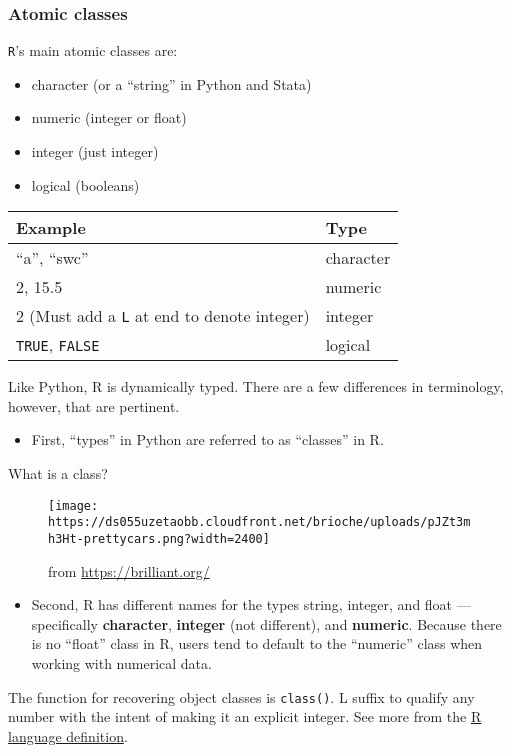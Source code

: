 \documentclass[
]{book}
\providecommand{\tightlist}{%
  \setlength{\itemsep}{0pt}\setlength{\parskip}{0pt}}
\begin{document}
\hypertarget{atomic-classes}{%
\subsubsection{Atomic classes}\label{atomic-classes}}

\texttt{R}'s main atomic classes are:

\begin{itemize}
\tightlist
\item
  character (or a ``string'' in Python and Stata)
\item
  numeric (integer or float)
\item
  integer (just integer)
\item
  logical (booleans)
\end{itemize}

\begin{longtable}[]{@{}ll@{}}
\toprule
Example & Type\tabularnewline
\midrule
\endhead
``a'', ``swc'' & character\tabularnewline
2, 15.5 & numeric\tabularnewline
2 (Must add a \texttt{L} at end to denote integer) & integer\tabularnewline
\texttt{TRUE}, \texttt{FALSE} & logical\tabularnewline
\bottomrule
\end{longtable}

Like Python, R is dynamically typed. There are a few differences in terminology, however, that are pertinent.

\begin{itemize}
\tightlist
\item
  First, ``types'' in Python are referred to as ``classes'' in R.
\end{itemize}

What is a class?

\begin{figure}
\centering
\texttt{[image: https://ds055uzetaobb.cloudfront.net/brioche/uploads/pJZt3mh3Ht-prettycars.png?width=2400]}
\caption{from \url{https://brilliant.org/}}
\end{figure}

\begin{itemize}
\tightlist
\item
  Second, R has different names for the types string, integer, and float --- specifically \textbf{character}, \textbf{integer} (not different), and \textbf{numeric}. Because there is no ``float'' class in R, users tend to default to the ``numeric'' class when working with numerical data.
\end{itemize}

The function for recovering object classes is \texttt{class()}. L suffix to qualify any number with the intent of making it an explicit integer. See more from the \href{https://cran.r-project.org/doc/manuals/R-lang.html}{R language definition}.
\end{document}
